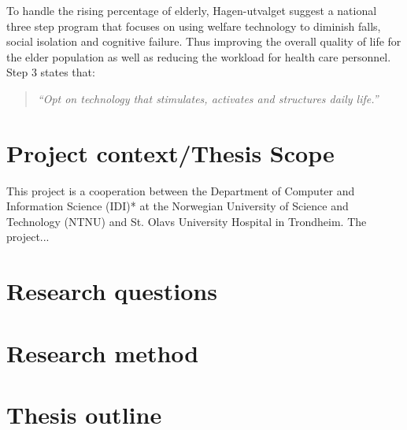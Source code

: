 To handle the rising percentage of elderly, Hagen-utvalget suggest a national three step program that focuses on using welfare technology to diminish falls, social isolation and cognitive failure. Thus improving the overall quality of life for the elder population as well as reducing the workload for health care personnel. 
Step 3 states that:
\begin{quote}
\textit{``Opt on technology that stimulates, activates and structures daily life.''}
\end{quote}


\section{Project context/Thesis Scope}
This project is a cooperation between the Department of Computer and Information Science (IDI)* at the Norwegian University of Science and Technology (NTNU) and St. Olavs University Hospital in Trondheim. The project...

\section{Research questions}

\section{Research method}

\section{Thesis outline}
